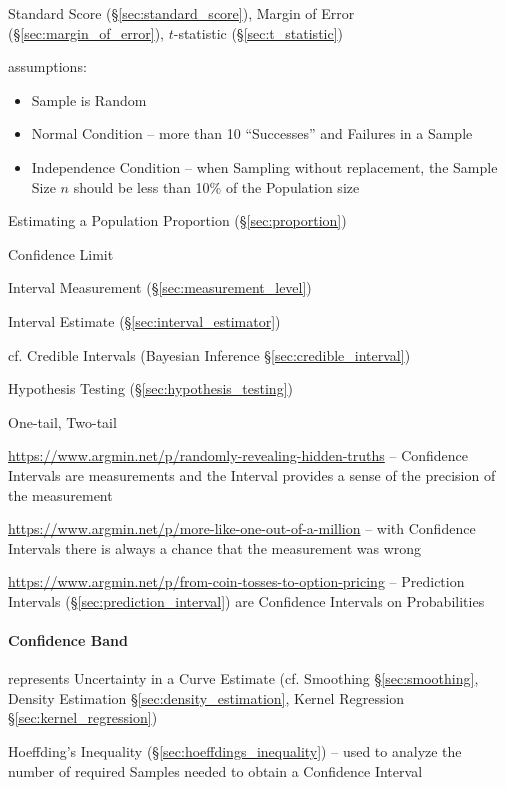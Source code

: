 \fist Standard Score (\S\ref{sec:standard_score}), Margin of Error
(\S\ref{sec:margin_of_error}), $t$-statistic (\S\ref{sec:t_statistic})

assumptions:
\begin{itemize}
  \item Sample is Random
  \item Normal Condition -- more than 10 ``Successes'' and Failures in a Sample
  \item Independence Condition -- when Sampling without replacement, the Sample
    Size $n$ should be less than 10\% of the Population size
\end{itemize}

Estimating a Population Proportion (\S\ref{sec:proportion})

Confidence Limit

Interval Measurement (\S\ref{sec:measurement_level})

Interval Estimate (\S\ref{sec:interval_estimator})

cf. Credible Intervals (Bayesian Inference \S\ref{sec:credible_interval})

Hypothesis Testing (\S\ref{sec:hypothesis_testing})

One-tail, Two-tail

\url{https://www.argmin.net/p/randomly-revealing-hidden-truths} -- Confidence
Intervals are measurements and the Interval provides a sense of the precision of
the measurement

\url{https://www.argmin.net/p/more-like-one-out-of-a-million} -- with Confidence
Intervals there is always a chance that the measurement was wrong

\url{https://www.argmin.net/p/from-coin-tosses-to-option-pricing} -- Prediction
Intervals (\S\ref{sec:prediction_interval}) are Confidence Intervals on
Probabilities



\paragraph{Confidence Band}\label{sec:confidence_band}\hfill

represents Uncertainty in a Curve Estimate (cf. Smoothing \S\ref{sec:smoothing},
Density Estimation \S\ref{sec:density_estimation}, Kernel Regression
\S\ref{sec:kernel_regression})

Hoeffding's Inequality (\S\ref{sec:hoeffdings_inequality}) -- used to analyze
the number of required Samples needed to obtain a Confidence Interval



